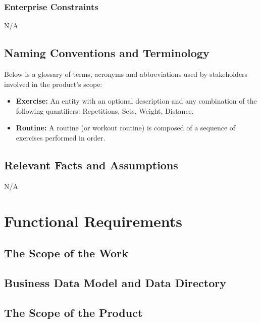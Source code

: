 \documentclass[12pt]{article}
\begin{document}
\subsubsection{Enterprise Constraints}
N/A

\subsection{Naming Conventions and Terminology}
Below is a glossary of terms, acronyms and abbreviations used by stakeholders involved in the product's scope:
\begin{itemize}
	\item \textbf{Exercise: } An entity with an optional description and any combination of the following quantifiers: Repetitions, Sets, Weight, Distance. 
	\item \textbf{Routine: } A routine (or workout routine) is composed of a sequence of exercises performed in order.
\end{itemize}
\subsection{Relevant Facts and Assumptions}
N/A
\section{Functional Requirements}
\subsection{The Scope of the Work}
\subsection{Business Data Model and Data Directory}
\subsection{The Scope of the Product}
\end{document}
